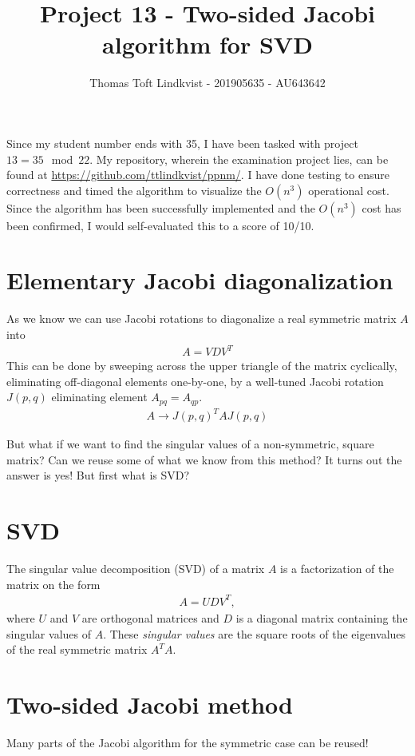 \documentclass{article}
\title{Project 13 - Two-sided Jacobi algorithm for SVD}
\author{Thomas Toft Lindkvist - 201905635 - AU643642}
\date{}
\begin{document}
    \maketitle
    \noindent
    Since my student number ends with 35, I have been tasked with project $13 = 35 \mod 22 $.
    My repository, wherein the examination project lies, can be found at \url{https://github.com/ttlindkvist/ppnm/}.
    I have done testing to ensure correctness and timed the algorithm to visualize the $ O(n^3) $ operational cost. Since the algorithm has been successfully implemented and the $ O(n^3) $ cost has been confirmed, I would self-evaluated this to a score of 10/10.
    
    \section{Elementary Jacobi diagonalization}
    As we know we can use Jacobi rotations to diagonalize a real symmetric matrix $ A $ into
    \begin{align}
    	A = VDV^T
    \end{align}
	This can be done by sweeping across the upper triangle of the matrix cyclically, eliminating off-diagonal elements one-by-one, by a well-tuned Jacobi rotation $ J(p,q) $ eliminating element $ A_{pq}=A_{qp} $.
	\begin{align}
		A \to J(p,q)^T A J(p,q)
	\end{align}
	
	But what if we want to find the singular values of a non-symmetric, square matrix? Can we reuse some of what we know from this method? It turns out the answer is yes! But first what is SVD?
	
	\section{SVD}
	The singular value decomposition (SVD) of a matrix $ A $ is a factorization of the matrix on the form
	\begin{align}
		A = UDV^T,
	\end{align}
	where $ U $ and $ V $ are orthogonal matrices and $ D $ is a diagonal matrix containing the singular values of $ A $. These \textit{singular values} are the square roots of the eigenvalues of the real symmetric matrix $ A^TA $.	
	
    
    \section{Two-sided Jacobi method}
    Many parts of the Jacobi algorithm for the symmetric case can be reused! 
\end{document}
